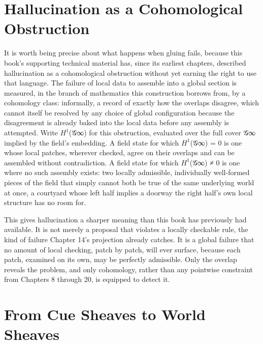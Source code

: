 \section{Hallucination as a Cohomological Obstruction}

It is worth being precise about what happens when gluing fails, because this book's supporting technical material has, since its earliest chapters, described hallucination as a cohomological obstruction without yet earning the right to use that language. The failure of local data to assemble into a global section is measured, in the branch of mathematics this construction borrows from, by a cohomology class: informally, a record of exactly how the overlaps disagree, which cannot itself be resolved by any choice of global configuration because the disagreement is already baked into the local data before any assembly is attempted. Write \(H^1\)(𝒢∞) for this obstruction, evaluated over the full cover 𝒢∞ implied by the field's embedding. A field state for which \(H^1\)(𝒢∞) = 0 is one whose local patches, wherever checked, agree on their overlaps and can be assembled without contradiction. A field state for which \(H^1\)(𝒢∞) ≠ 0 is one where no such assembly exists: two locally admissible, individually well-formed pieces of the field that simply cannot both be true of the same underlying world at once, a courtyard whose left half implies a doorway the right half's own local structure has no room for.

This gives hallucination a sharper meaning than this book has previously had available. It is not merely a proposal that violates a locally checkable rule, the kind of failure Chapter 14's projection already catches. It is a global failure that no amount of local checking, patch by patch, will ever surface, because each patch, examined on its own, may be perfectly admissible. Only the overlap reveals the problem, and only cohomology, rather than any pointwise constraint from Chapters 8 through 20, is equipped to detect it.

\section{From Cue Sheaves to World Sheaves}


